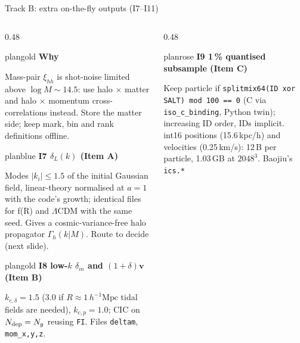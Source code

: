 \documentclass[UTF8]{beamer}
\newcommand{\Mpch}{\,h^{-1}\mathrm{Mpc}}
\begin{document}
\begin{frame}{Track B: extra on-the-fly outputs (I7--I11)}
  \footnotesize
  \begin{columns}[T,totalwidth=\textwidth]
    \begin{column}{0.48\textwidth}
      \begin{phasebox}[colback=planpale]{plangold}
        {\color{plangold}\bfseries Why}\par\smallskip
        \scriptsize
        Mass-pair $\xi_{hh}$ is shot-noise limited above $\log M \sim 14.5$: use halo $\times$ matter and halo $\times$ momentum
        cross-correlations instead. Store the matter side; keep mark, bin and rank definitions offline.
      \end{phasebox}
      \vspace{0.3ex}
      \begin{phasebox}{planblue}
        {\color{planblue}\bfseries I7 $\delta_L(k)$ (Item A)}\par\smallskip
        \scriptsize
        Modes $|k_i| \le 1.5$ of the initial Gaussian field, linear-theory normalised at $a = 1$ with the code's growth; identical files for
        f(R) and $\Lambda$CDM with the same seed. Gives a cosmic-variance-free halo propagator $\Gamma_h(k|M)$. Route to decide (next slide).
      \end{phasebox}
      \vspace{0.3ex}
      \begin{phasebox}{plangold}
        {\color{plangold}\bfseries I8 low-$k$ $\delta_m$ and $(1+\delta)\mathbf v$ (Item B)}\par\smallskip
        \scriptsize
        $k_{c,\delta} = 1.5$ (3.0 if $R \approx 1\Mpch$ tidal fields are needed), $k_{c,p} = 1.0$; CIC on $N_{\rm dep} = N_g$ reusing \texttt{FI}.
        Files \texttt{deltam}, \texttt{mom\_x,y,z}.
      \end{phasebox}
    \end{column}
    \hfill
    \begin{column}{0.48\textwidth}
      \begin{phasebox}{planrose}
        {\color{planrose}\bfseries I9 1\,\% quantised subsample (Item C)}\par\smallskip
        \scriptsize
        Keep particle if \texttt{splitmix64(ID xor SALT) mod 100 == 0} (C via \texttt{iso\_c\_binding}, Python twin); increasing ID order, IDs implicit.
        int16 positions (15.6\,kpc/h) and velocities (0.25\,km/s): 12\,B per particle, 1.03\,GB at $2048^3$. Baojiu's \texttt{ics.*}

\end{phasebox}
\end{column}
\end{columns}
\end{frame}
\end{document}
